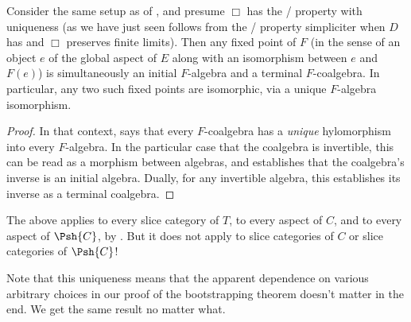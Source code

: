\begin{corollary}\label{InitialTerminalCoincidence}
Consider the same setup as of , and presume $\Box$ has the \Loeb/ property with uniqueness (as we have just seen follows from the \Loeb/ property simpliciter when $D$ has and $\Box$ preserves finite limits). Then any fixed point of $F$ (in the sense of an object $e$ of the global aspect of $E$ along with an isomorphism between $e$ and $F(e)$) is simultaneously an initial $F$-algebra and a terminal $F$-coalgebra. In particular, any two such fixed points are isomorphic, via a unique $F$-algebra isomorphism.
\end{corollary}
\begin{proof}
In that context,  says that every $F$-coalgebra has a \emph{unique} hylomorphism into every $F$-algebra. In the particular case that the coalgebra is invertible, this can be read as a morphism between algebras, and establishes that the coalgebra's inverse is an initial algebra. Dually, for any invertible algebra, this establishes its inverse as a terminal coalgebra.
\end{proof}

\begin{TODOblock}
The above applies to every slice category of $T$, to every aspect of $C$, and to every aspect of $\Psh{C}$, by . But it does not apply to slice categories of $C$ or slice categories of $\Psh{C}$!
\end{TODOblock}

\begin{observation}
Note that this uniqueness means that the apparent dependence on various arbitrary choices in our proof of the bootstrapping theorem doesn't matter in the end. We get the same result no matter what.
\end{observation}

